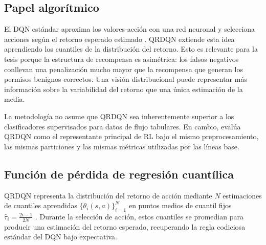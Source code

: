 \subsection{Papel algorítmico}
El DQN estándar aproxima los valores-acción con una red neuronal y selecciona acciones según el retorno esperado estimado \parencite{Mnih2015DQN}. QRDQN extiende esta idea aprendiendo los cuantiles de la distribución del retorno. Esto es relevante para la tesis porque la estructura de recompensa es asimétrica: los falsos negativos conllevan una penalización mucho mayor que la recompensa que generan los permisos benignos correctos. Una visión distribucional puede representar más información sobre la variabilidad del retorno que una única estimación de la media.

La metodología no asume que QRDQN sea inherentemente superior a los clasificadores supervisados para datos de flujo tabulares. En cambio, evalúa QRDQN como el representante principal de RL bajo el mismo preprocesamiento, las mismas particiones y las mismas métricas utilizadas por las líneas base.

\subsection{Función de pérdida de regresión cuantílica}
QRDQN representa la distribución del retorno de acción mediante $N$ estimaciones de cuantiles aprendidas $\{\theta_i(s, a)\}_{i=1}^{N}$ en puntos medios de cuantil fijos $\hat{\tau}_i = \frac{2i-1}{2N}$ \parencite{Dabney2018QRDQN}. Durante la selección de acción, estos cuantiles se promedian para producir una estimación del retorno esperado, recuperando la regla codiciosa estándar del DQN bajo expectativa.

